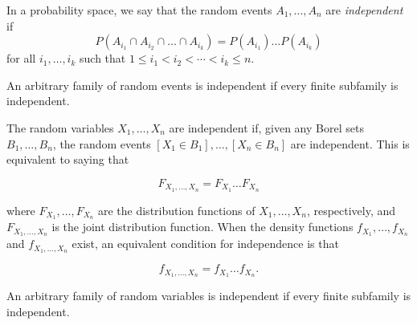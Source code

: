 \documentclass[12pt]{article}
\begin{document}
In a probability space, we say that the random events $A_1,\dots,A_n$ are 
\emph{independent} if
$$ P(A_{i_1}\cap A_{i_2}\cap\dots\cap A_{i_k}) = P(A_{i_1})\dots P(A_{i_k}) $$
for all $i_1,\dots,i_k$ such that $1\leq i_1<i_2<\cdots<i_k\leq n$.

An arbitrary family of random events is independent if every finite subfamily is independent.

The random variables $X_1,\dots,X_n$ are independent if, given any Borel sets $B_1,\dots,B_n$, the random events $[X_1\in B_1],\dots,[X_n\in B_n]$ are independent. This is equivalent to saying that 

\[F_{X_1,\dots,X_n} = F_{X_1}\dots F_{X_n}\]

where $F_{X_1},\dots, F_{X_n}$ are the distribution functions of $X_1,\dots, X_n$, respectively, and $F_{X_1,\dots,X_n}$ is the joint distribution function. When the density functions $f_{X_1},\dots,f_{X_n}$ and $f_{X_1,\dots,X_n}$ exist, an equivalent condition for independence is that

\[f_{X_1,\dots,X_n} = f_{X_1}\dots f_{X_n}.\]

An arbitrary family of random variables is independent if every finite subfamily is independent.
\end{document}
